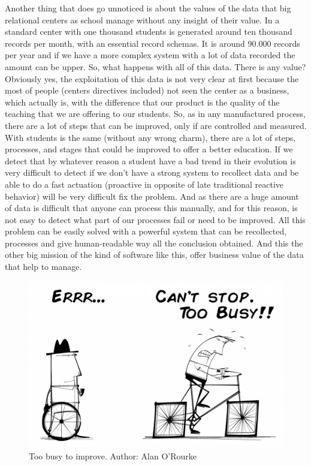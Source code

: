 Another thing that does go unnoticed is about the values of the data that big
relational centers as school manage without any insight of their value.
In a standard center with one thousand students is generated around ten thousand records per
month, with an essential record schemas.
\intro
It is around 90.000 records per year
and if we have a more complex system with a lot of data recorded the amount can be upper.
So, what happens with all of this data. There is any value? Obviously yes,
the exploitation of this data is not very clear at first because the most of
people (centers directives included) not seen the center as a business, which
actually is, with the difference that our product is the quality of the teaching that we are
offering to our students.
\intro
So, as in any manufactured process, there are a lot of steps that can be improved,
only if are controlled and measured. With students is the same (without any wrong
charm), there are a lot of steps, processes, and stages that could be improved to
offer a better education.
If we detect that by whatever reason a student have a bad trend in their evolution
is very difficult to detect if we don't have a strong system to recollect data
and be able to do a fast actuation (proactive in opposite of late traditional
reactive behavior) will be very difficult fix the problem.
\intro
And as there are a huge amount of data is difficult that anyone can process this
manually, and for this reason, is not easy to detect what part of our processes
fail or need to be improved.
All this problem can be easily solved with a powerful system that can be recollected,
processes and give human-readable way all the conclusion obtained.
\intro
And this the other big mission of the kind of software like this, offer
business value of the data that help to manage.

\begin{figure}[H]
  \includegraphics[scale=0.5]{img/toobusytoimprove.jpeg}
  \centering
  \caption{Too busy to improve. Author: Alan O'Rourke}
\end{figure}
